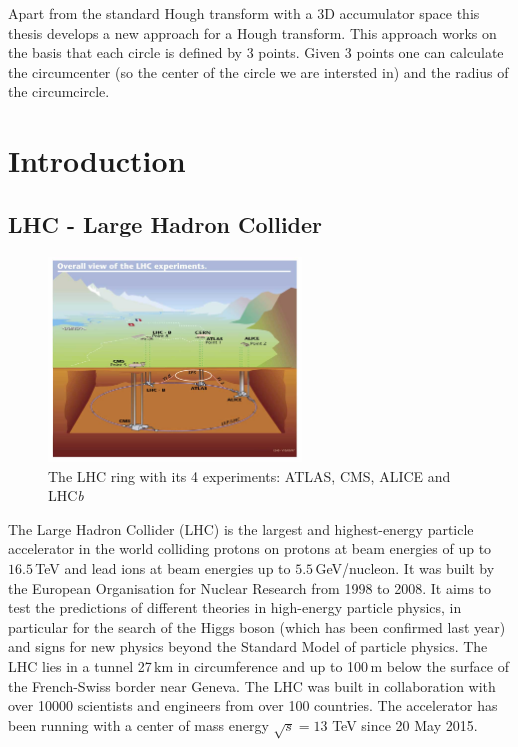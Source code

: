 \documentclass[11pt,twoside]{scrreprt}
\begin{document}
Apart from the standard Hough transform with a 3D accumulator space this thesis develops a new approach for a Hough transform. 
This approach works on the basis that each circle is defined by 3 points. Given 3 points one can calculate the circumcenter 
(so the center of the circle we are intersted in) and the radius of the circumcircle.

\tableofcontents
\listoftables
\listoffigures	

\chapter{Introduction}
\section{LHC - Large Hadron Collider} %
\label{sec:lhc_large_hadron_collider}
\begin{figure}[htb]
  \centering
  \includegraphics[width=0.6\textwidth]{pics/lhc}
  \caption{The LHC ring with its 4 experiments: ATLAS, CMS, ALICE and LHC\textit{b}}
  \label{fig:lhc}
\end{figure}

The Large Hadron Collider (LHC) is the largest and highest-energy particle accelerator in the world colliding protons on protons
at beam energies of up to $16.5$\,TeV and lead ions at beam energies up to $5.5$\,GeV/nucleon. It was built by the European 
Organisation for Nuclear Research from 1998 to 2008. It aims to test the predictions of different theories in high-energy particle 
physics, in particular for the search of the Higgs boson (which has been confirmed last year) and signs for new physics beyond 
the Standard Model of particle physics. The LHC lies in a tunnel 27\,km in circumference and up to 100\,m below the surface of the 
French-Swiss border near Geneva. The LHC was built in collaboration with over 10000 scientists and engineers from over 100 countries. 
The accelerator has been running with a center of mass energy $\sqrt{s} = 13$ TeV since 20 May 2015.
\end{document}
